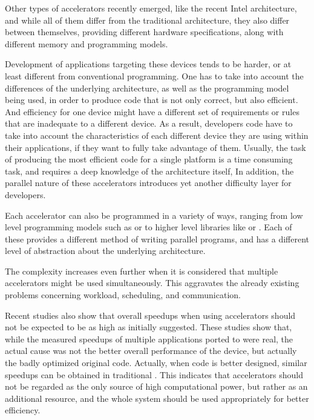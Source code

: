 \documentclass[main.tex]{subfiles}
\begin{document}
Other types of accelerators recently emerged, like the recent Intel \mic architecture, and while all of them differ from the traditional \cpu architecture, they also differ between themselves, providing different hardware specifications, along with different memory and programming models.

Development of applications targeting these devices tends to be harder, or at least different from conventional programming. One has to take into account the differences of the underlying architecture, as well as the programming model being used, in order to produce code that is not only correct, but also efficient. And efficiency for one device might have a different set of requirements or rules that are inadequate to a different device. As a result, developers code have to take into account the characteristics of each different device they are using within their applications, if they want to fully take advantage of them. Usually, the task of producing the most efficient code for a single platform is a time consuming task, and requires a deep knowledge of the architecture itself, In addition, the parallel nature of these accelerators introduces yet another difficulty layer for developers.

Each accelerator can also be programmed in a variety of ways, ranging from low level programming models such as \cuda or \opencl to higher level libraries like \openmp or \openacc. Each of these provides a different method of writing parallel programs, and has a different level of abstraction about the underlying architecture.

The complexity increases even further when it is considered that multiple accelerators might be used simultaneously. This aggravates the already existing problems concerning workload, scheduling, and communication.

Recent studies \cite{lee2010debunking,bordawekar2010believe} also show that overall speedups when using accelerators should not be expected to be as high as initially suggested. These studies show that, while the measured speedups of multiple applications ported to \gpus were real, the actual cause was not the better overall performance of the device, but actually the badly optimized original \cpu code. Actually, when code is better designed, similar speedups can be obtained in traditional \cpus. This indicates that accelerators should not be regarded as the only source of high computational power, but rather as an additional resource, and the whole system should be used appropriately for better efficiency.
\end{document}
